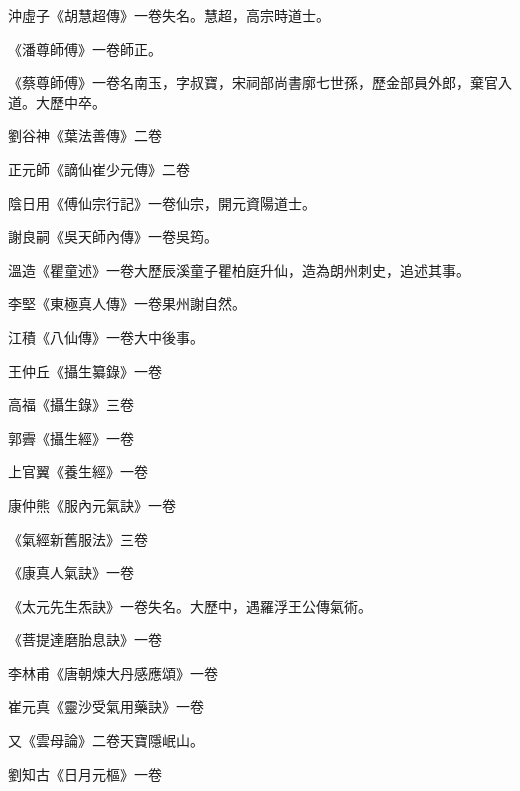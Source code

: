 \begin{pinyinscope}
 沖虛子《胡慧超傳》一卷失名。慧超，高宗時道士。



 《潘尊師傅》一卷師正。



 《蔡尊師傅》一卷名南玉，字叔寶，宋祠部尚書廓七世孫，歷金部員外郎，棄官入道。大歷中卒。



 劉谷神《葉法善傳》二卷



 正元師《謫仙崔少元傳》二卷



 陰日用《傅仙宗行記》一卷仙宗，開元資陽道士。



 謝良嗣《吳天師內傳》一卷吳筠。



 溫造《瞿童述》一卷大歷辰溪童子瞿柏庭升仙，造為朗州刺史，追述其事。



 李堅《東極真人傳》一卷果州謝自然。



 江積《八仙傳》一卷大中後事。



 王仲丘《攝生纂錄》一卷



 高福《攝生錄》三卷



 郭霽《攝生經》一卷



 上官翼《養生經》一卷



 康仲熊《服內元氣訣》一卷



 《氣經新舊服法》三卷



 《康真人氣訣》一卷



 《太元先生炁訣》一卷失名。大歷中，遇羅浮王公傳氣術。



 《菩提達磨胎息訣》一卷



 李林甫《唐朝煉大丹感應頌》一卷



 崔元真《靈沙受氣用藥訣》一卷



 又《雲母論》二卷天寶隱岷山。



 劉知古《日月元樞》一卷




\end{pinyinscope}
